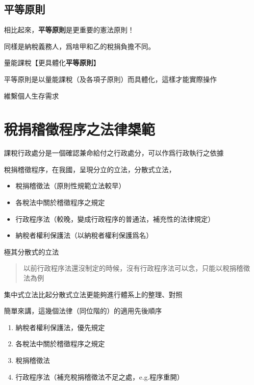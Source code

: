 \documentclass[]{ctexbook}
\providecommand{\tightlist}{%
  \setlength{\itemsep}{0pt}\setlength{\parskip}{0pt}}
\begin{document}
\hypertarget{ux5e73ux7b49ux539fux5247}{%
\subsection{平等原則}\label{ux5e73ux7b49ux539fux5247}}

相比起來，\textbf{平等原則}是更重要的憲法原則！

同樣是納稅義務人，爲啥甲和乙的稅捐負擔不同。

量能課稅【更具體化\textbf{平等原則}】

平等原則是以量能課稅（及各項子原則）而具體化，這樣才能實際操作

維繫個人生存需求

\hypertarget{ux7a05ux6350ux7a3dux5fb5ux7a0bux5e8fux4e4bux6cd5ux5f8bux69fcux7bc4}{%
\section{稅捐稽徵程序之法律槼範}\label{ux7a05ux6350ux7a3dux5fb5ux7a0bux5e8fux4e4bux6cd5ux5f8bux69fcux7bc4}}

課稅行政處分是一個確認兼命給付之行政處分，可以作爲行政執行之依據

稅捐稽徵程序，在我國，呈現分立的立法，分散式立法，

\begin{itemize}
\tightlist
\item
  稅捐稽徵法（原則性規範立法較早）
\item
  各稅法中關於稽徵程序之規定
\item
  行政程序法（較晚，變成行政程序的普通法，補充性的法律規定）
\item
  納稅者權利保護法（以納稅者權利保護爲名）
\end{itemize}

極其分散式的立法

\begin{quote}
以前行政程序法還沒制定的時候，沒有行政程序法可以念，只能以稅捐稽徵法為例
\end{quote}

集中式立法比起分散式立法更能夠進行體系上的整理、對照

簡單來講，這幾個法律（同位階的）的適用先後順序

\begin{enumerate}
\def\labelenumi{\arabic{enumi}.}
\tightlist
\item
  納稅者權利保護法，優先規定
\item
  各稅法中關於稽徵程序之規定
\item
  稅捐稽徵法
\item
  行政程序法（補充稅捐稽徵法不足之處，e.g.程序重開）
\end{enumerate}
\end{document}
